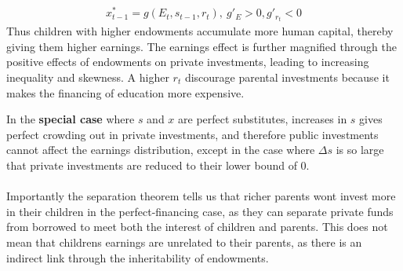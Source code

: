 \documentclass[12pt, a4paper]{article}
\begin{document}
\begin{multicols}{2}
\begin{align*}
x_{t-1}^* = g(E_t, s_{t-1},r_t), \ g'_E>0, g'_{r_t}<0
\end{align*}
Thus children with higher endowments accumulate more human capital, thereby giving them higher earnings. The earnings effect is further magnified through the positive effects of endowments on private investments, leading to increasing inequality and skewness. A higher $r_t$ discourage parental investments because it makes the financing of education more expensive.

In the \textbf{special case} where $s$ and $x$ are perfect substitutes, increases in $s$ gives perfect crowding out in private investments, and therefore public investments cannot affect the earnings distribution, except in the case where $\Delta s$ is so large that private investments are reduced to their lower bound of 0.
\\ \\
Importantly the separation theorem tells us that richer parents wont invest more in their children in the perfect-financing case, as they can separate private funds from borrowed to meet both the interest of children and parents. This does not mean that childrens earnings are unrelated to their parents, as there is an indirect link through the inheritability of endowments.


\end{multicols}
\end{document}
